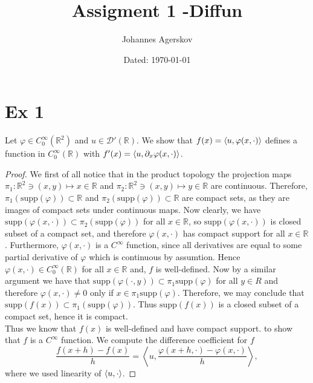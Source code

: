 \documentclass[a4paper,11pt]{article}
\author{Johannes Agerskov}
\date{Dated: \today}
\title{Assigment 1 -Diffun}
\newcommand{\supp}{\text{supp}}
\newcommand{\R}{\mathbb{R}}
\numberwithin{equation}{section}
\begin{document}
\maketitle	
\section*{Ex 1}
Let $ \varphi\in C^\infty_0(\R^2) $ and $ u\in\mathcal{D}'(\R) $. We show that $ f(x)=\braket{u,\varphi(x,\cdot)} $ defines a function in $ C^\infty_0(\R) $ with $ f'(x)=\braket{u,\partial_x\varphi(x,\cdot)} $.
\begin{proof}
	We first of all notice that in the product topology the projection maps $ \pi_1: \R^2\ni(x,y)\mapsto x\in \R $ and $ \pi_2: \R^2\ni(x,y)\mapsto y\in \R $ are continuous. Therefore, $ \pi_1(\supp(\varphi))\subset \R $ and $ \pi_2(\supp(\varphi))\subset \R $ are compact sets, as they are images of compact sets under continuous maps.	
	 Now clearly, we have $ \supp(\varphi(x,\cdot))\subset \pi_2(\supp(\varphi)) $ for all $ x\in \R $, so $ \supp(\varphi(x,\cdot)) $ is closed subset of a compact set, and therefore $ \varphi(x,\cdot) $ has compact support for all $ x\in \R $. Furthermore, $ \varphi(x,\cdot) $ is a $ C^\infty $ function, since all derivatives are equal to some partial derivative of $ \varphi $ which is continuous by assumtion. Hence $ \varphi(x,\cdot)\in C^{\infty}_0(\R) $ for all $ x\in \R $ and, $ f $ is well-defined. Now by a similar argument we have that $ \supp(\varphi(\cdot,y))\subset\pi_1\supp(\varphi) $ for all $ y\in R $ and therefore $ \varphi(x,\cdot)\neq0 $ only if $ x\in\pi_1\supp(\varphi) $. Therefore, we may conclude that $ \supp(f(x))\subset \pi_1(\supp(\varphi)) $. Thus $ \supp(f(x)) $ is a closed subset of a compact set, hence it is compact.\\
	 Thus we know that $ f(x) $ is well-defined and have compact support. to show that $ f $ is a $ C^\infty $ function. We compute the difference coefficient for $ f $\begin{equation}
	 \frac{f(x+h)-f(x)}{h}=\left\langle u, \frac{\varphi(x+h,\cdot)-\varphi(x,\cdot)}{h}\right\rangle,
	 \end{equation}
	 where we used linearity of $ \braket{u,\cdot} $.

\end{proof}
\end{document}
